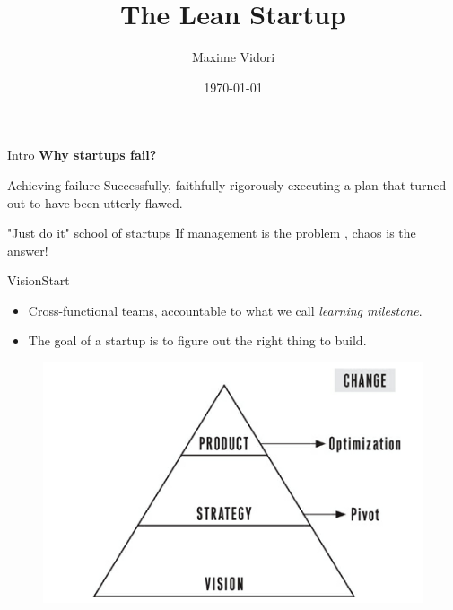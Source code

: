 \documentclass[aspectratio=169]{beamer}
\title{The Lean Startup}
\date{\today}
\author{Maxime Vidori}
\begin{document}
\begin{frame}
  \titlepage
\end{frame}

\begin{frame}{Intro}
  \pause
  \Large \textbf{Why startups fail?} \normalsize \\
  \pause
\begin{block}{Achieving failure}
    Successfully, faithfully rigorously executing a plan that turned out to have
     been utterly flawed.
  \end{block}
  \pause
  \begin{block}{"Just do it" school of startups}
    If management is the problem , chaos is the answer!
  \end{block}


\end{frame}


\begin{frame}{Vision}{Start}
  \begin{itemize}
    \item Cross-functional teams, accountable to what we call \textit{learning milestone}.
    \item The goal of a startup is to figure out the right thing to build.
  \end{itemize}
  \begin{figure}
    \includegraphics[scale=0.55]{LS_pyramid}
  \end{figure}

\end{frame}

\end{document}
